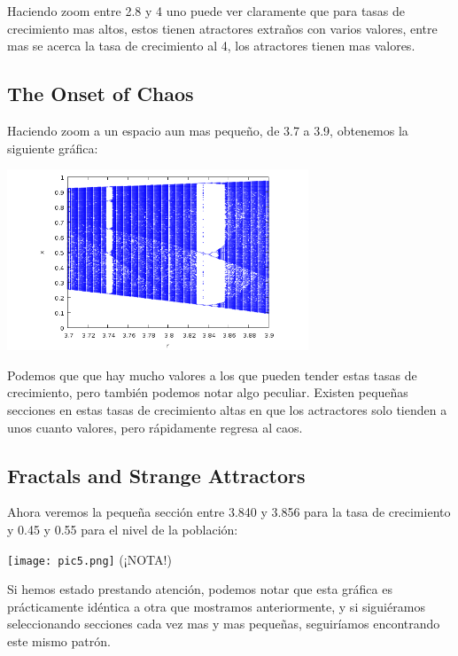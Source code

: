 \documentclass{article}
\begin{document}
Haciendo zoom entre 2.8 y 4 uno puede ver claramente que para tasas de crecimiento mas altos, estos tienen atractores extraños con varios valores, entre mas se acerca la tasa de crecimiento al 4, los atractores tienen mas valores.

\subsection{The Onset of Chaos}

Haciendo zoom a un espacio aun mas pequeño, de 3.7 a 3.9, obtenemos la siguiente gráfica:

\begin{center}
	\includegraphics[width=9cm]{pic4.png}
    
\end{center}
\vspace{0.3cm}

Podemos que que hay mucho valores a los que pueden tender estas tasas de crecimiento, pero también podemos notar algo peculiar. Existen pequeñas secciones en estas tasas de crecimiento altas en que los actractores solo tienden a unos cuanto valores, pero rápidamente regresa al caos.

\subsection{Fractals and Strange Attractors}

Ahora veremos la pequeña sección entre 3.840 y 3.856 para la tasa de crecimiento y 0.45 y 0.55 para el nivel de la población:

\begin{center}
	\texttt{[image: pic5.png]}
    (¡NOTA!)
\end{center}
\vspace{0.3cm}

Si hemos estado prestando atención, podemos notar que esta gráfica es prácticamente idéntica a otra que mostramos anteriormente, y si siguiéramos seleccionando secciones cada vez mas y mas pequeñas, seguiríamos encontrando este mismo patrón. 
\end{document}
